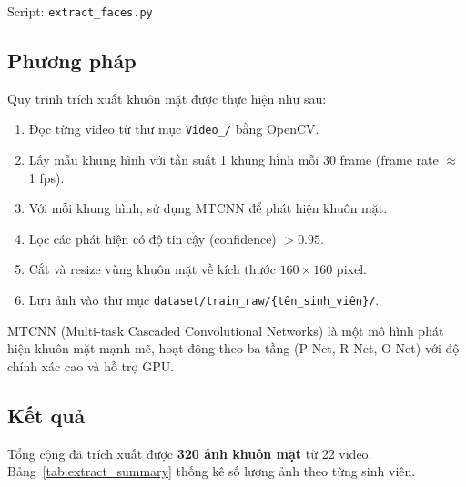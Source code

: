 \documentclass[12pt,a4paper]{article}
\begin{document}
Script: \texttt{extract\_faces.py}

\subsection{Phương pháp}
\label{subsec:extract_method}

Quy trình trích xuất khuôn mặt được thực hiện như sau:
\begin{enumerate}
    \item Đọc từng video từ thư mục \texttt{Video\_/} bằng OpenCV.
    \item Lấy mẫu khung hình với tần suất 1 khung hình mỗi 30 frame (frame rate $\approx$ 1 fps).
    \item Với mỗi khung hình, sử dụng MTCNN \cite{mtcnn} để phát hiện khuôn mặt.
    \item Lọc các phát hiện có độ tin cậy (confidence) $> 0.95$.
    \item Cắt và resize vùng khuôn mặt về kích thước $160 \times 160$ pixel.
    \item Lưu ảnh vào thư mục \texttt{dataset/train\_raw/\{tên\_sinh\_viên\}/}.
\end{enumerate}

MTCNN (Multi-task Cascaded Convolutional Networks) là một mô hình phát hiện khuôn mặt mạnh mẽ, hoạt động theo ba tầng (P-Net, R-Net, O-Net) với độ chính xác cao và hỗ trợ GPU.

\subsection{Kết quả}
\label{subsec:extract_results}

Tổng cộng đã trích xuất được \textbf{320 ảnh khuôn mặt} từ 22 video. Bảng~\ref{tab:extract_summary} thống kê số lượng ảnh theo từng sinh viên.
\end{document}
